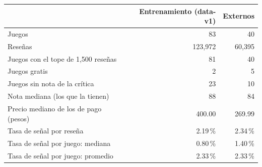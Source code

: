 \begin{tabular}{lrr}
\toprule
 & Entrenamiento (data-v1) & Externos \\
\midrule
Juegos & 83 & 40 \\
Reseñas & 123,972 & 60,395 \\
Juegos con el tope de 1,500 reseñas & 81 & 40 \\
Juegos gratis & 2 & 5 \\
Juegos sin nota de la crítica & 23 & 10 \\
Nota mediana (los que la tienen) & 88 & 84 \\
Precio mediano de los de pago (pesos) & 400.00 & 269.99 \\
Tasa de señal por reseña & 2.19\,\% & 2.34\,\% \\
Tasa de señal por juego: mediana & 0.80\,\% & 1.40\,\% \\
Tasa de señal por juego: promedio & 2.33\,\% & 2.33\,\% \\
\bottomrule
\end{tabular}
